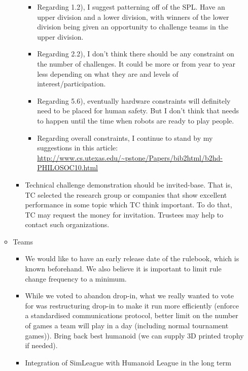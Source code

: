 \documentclass{article}
\begin{document}
\begin{itemize}
\begin{itemize}
\begin{itemize}
\begin{itemize}
               \item Regarding 1.2), I suggest patterning off of the SPL.  Have an upper division and a lower division, with winners of the lower division being given an opportunity to challenge teams in the upper division.
               \item Regarding 2.2), I don't think there should be any constraint on the number of challenges.  It could be more or from year to year less depending on what they are and levels of interest/participation.
               \item Regarding 5.6), eventually hardware constraints will definitely need to be placed for human safety.  But I don't think that needs to happen until the time when robots are ready to play people. 
               \item Regarding overall constraints, I continue to stand by my suggestions in this article:    \url{http://www.cs.utexas.edu/~pstone/Papers/bib2html/b2hd-PHILOSOC10.html}
       \end{itemize}
           \item Technical challenge demonstration should be invited-base. That is, TC selected the research group or companies that show excellent performance in some topic  which TC think important. To do that, TC may request the money for invitation. Trustees may help to contact such organizations.
   \end{itemize}
       \item Teams
       \begin{itemize} 
           \item We would like to have an early release date of the rulebook, which is known beforehand. We also believe it is important to limit rule change frequency to a minimum.
           \item While we voted to abandon drop-in, what we really wanted to vote for was restructuring drop-in to make it run more efficiently (enforce a standardised communications protocol, better limit on the number of games a team will play in a day (including normal tournament games)). Bring back best humanoid (we can supply 3D printed trophy if needed).
           \item Integration of SimLeague with Humanoid League in the long term
       \end{itemize}

   \end{itemize}

\end{itemize}
\end{document}
